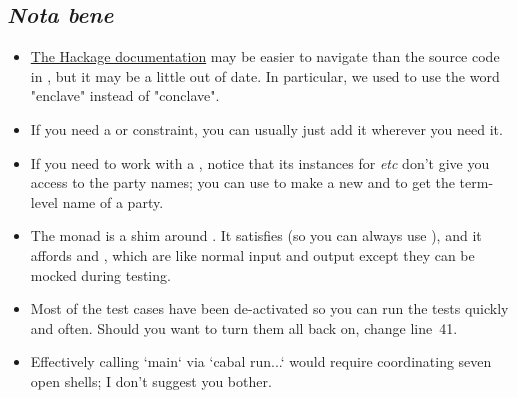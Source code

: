 \subsection{\textit{Nota bene}}
\begin{itemize}
  \item \href{https://hackage.haskell.org/package/MultiChor}{The Hackage documentation} may be easier to navigate than the source code in ,
  but it may be a little out of date.
  In particular, we used to use the word "enclave" instead of "conclave".
  \item If you need a  or  constraint, you can usually just add it wherever you need it.
  \item If you need to work with a , notice that its instances for  \textit{etc} don't give you access to the party names;
    you can use  to make a new  and  to get the term-level name of a party.
  \item The monad  is a shim around .
    It satisfies  (so you can always use ),
    and it affords  and ,  which are like normal input and output except they can be mocked during testing.
  \item Most of the test cases have been de-activated so you can run the tests quickly and often.
    Should you want to turn them all back on, change  line~41.
  \item Effectively calling `main` via `cabal run...` would require coordinating seven open shells; I don't suggest you bother.
\end{itemize}


